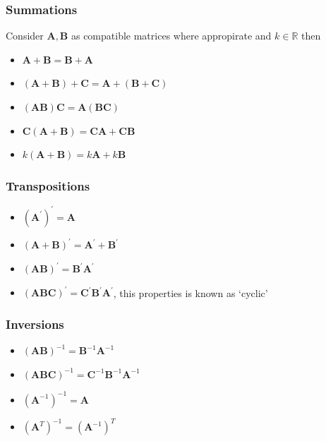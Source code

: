 \documentclass[11pt]{article}
\newcommand{\real}{\mathbb{R}}
\begin{document}
\subsubsection{Summations}
Consider $\mathbf{A}, \mathbf{B}$ as compatible matrices where appropirate and $k \in \real$ then
\begin{itemize}
    \item $\mathbf{A}+\mathbf{B}=\mathbf{B}+\mathbf{A}$
    \item $(\mathbf{A}+\mathbf{B})+\mathbf{C}=\mathbf{A}+(\mathbf{B}+\mathbf{C})$
    \item $(\mathbf{A B}) \mathbf{C}=\mathbf{A}(\mathbf{B C})$
    \item $\mathbf{C}(\mathbf{A}+\mathbf{B})=\mathbf{C} \mathbf{A}+\mathbf{C B}$
    \item $k(\mathbf{A}+\mathbf{B})=k \mathbf{A}+k \mathbf{B}$
\end{itemize}
\subsubsection{Transpositions}
\begin{itemize}
    \item $\left(\mathbf{A}^{\prime}\right)^{\prime}=\mathbf{A}$
    \item $(\mathbf{A}+\mathbf{B})^{\prime}=\mathbf{A}^{\prime}+\mathbf{B}^{\prime}$
    \item $(\mathbf{A B})^{\prime}=\mathbf{B}^{\prime} \mathbf{A}^{\prime}$
    \item $(\mathbf{A B C})^{\prime}=\mathbf{C}^{\prime} \mathbf{B}^{\prime} \mathbf{A}^{\prime}$, this properties is known as `cyclic'
\end{itemize}
\subsubsection{Inversions}
\begin{itemize}
    \item $(\mathbf{A B})^{-1}=\mathbf{B}^{-1} \mathbf{A}^{-1}$
    \item $(\mathbf{A B C})^{-1}=\mathbf{C}^{-1} \mathbf{B}^{-1} \mathbf{A}^{-1}$
    \item $\left(\mathbf{A}^{-1}\right)^{-1}=\mathbf{A}$
    \item $\left(\mathbf{A}^{T}\right)^{-1}=\left(\mathbf{A}^{-1}\right)^{T}$
\end{itemize}
\end{document}
